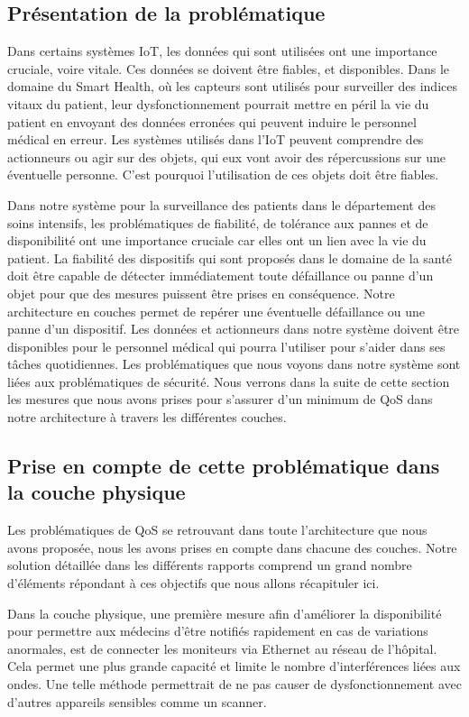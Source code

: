 \subsection{Présentation de la problématique}
 
Dans certains systèmes IoT, les données qui sont utilisées ont une importance cruciale, voire vitale. Ces données se doivent être fiables, et disponibles. Dans le domaine du Smart Health, où les capteurs sont utilisés pour surveiller des indices vitaux du patient, leur dysfonctionnement pourrait mettre en péril la vie du patient en envoyant des données erronées qui peuvent induire le personnel médical en erreur. Les systèmes utilisés dans l’IoT peuvent comprendre des actionneurs ou agir sur des objets, qui eux vont avoir des répercussions sur une éventuelle personne. C’est pourquoi l’utilisation de ces objets doit être fiables.

Dans notre système pour la surveillance des patients dans le département des soins intensifs, les problématiques de fiabilité, de tolérance aux pannes et de disponibilité ont une importance cruciale car elles ont un lien avec la vie du patient. La fiabilité des dispositifs qui sont proposés dans le domaine de la santé doit être capable de détecter immédiatement toute défaillance ou panne d’un objet pour que des mesures puissent être prises en conséquence. Notre architecture en couches permet de repérer une éventuelle défaillance ou une panne d’un dispositif. Les données et actionneurs dans notre système doivent être disponibles pour le personnel médical qui pourra l’utiliser pour s’aider dans ses tâches quotidiennes. Les problématiques que nous voyons dans notre système sont liées aux problématiques de sécurité. Nous verrons dans la suite de cette section les mesures que nous avons prises pour s’assurer d’un minimum de QoS dans notre architecture à travers les différentes couches.

\subsection{Prise en compte de cette problématique dans la couche physique}

Les problématiques de QoS se retrouvant dans toute l’architecture que nous avons proposée, nous les avons prises en compte dans chacune des couches. Notre solution détaillée dans les différents rapports comprend un grand nombre d’éléments répondant à ces objectifs que nous allons récapituler ici.

Dans la couche physique, une première mesure afin d’améliorer la disponibilité pour permettre aux médecins d’être notifiés rapidement en cas de variations anormales, est de connecter les moniteurs via Ethernet au réseau de l’hôpital. Cela permet une plus grande capacité et limite le nombre d’interférences liées aux ondes. Une telle méthode permettrait de ne pas causer de dysfonctionnement avec d’autres appareils sensibles comme un scanner.

